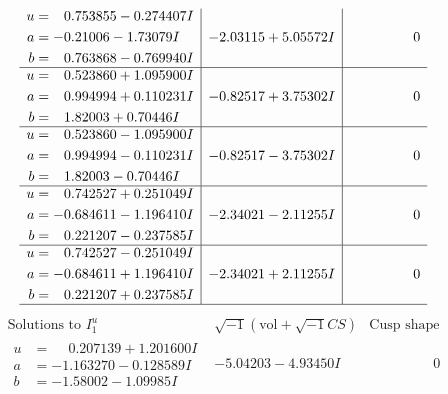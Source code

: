 \documentclass[1p]{elsarticle_modified}
\theoremstyle{definition}
\newcommand{\I}{\sqrt{-1}}
\begin{document}
$$\begin{array}{c|c|c}
\begin{aligned}
u &= \phantom{-}0.753855 - 0.274407 I \\
a &= -0.21006 - 1.73079 I \\
b &= \phantom{-}0.763868 - 0.769940 I\end{aligned}
 & -2.03115 + 5.05572 I & \phantom{-0.000000 } 0 \\ \hline\begin{aligned}
u &= \phantom{-}0.523860 + 1.095900 I \\
a &= \phantom{-}0.994994 + 0.110231 I \\
b &= \phantom{-}1.82003 + 0.70446 I\end{aligned}
 & -0.82517 + 3.75302 I & \phantom{-0.000000 } 0 \\ \hline\begin{aligned}
u &= \phantom{-}0.523860 - 1.095900 I \\
a &= \phantom{-}0.994994 - 0.110231 I \\
b &= \phantom{-}1.82003 - 0.70446 I\end{aligned}
 & -0.82517 - 3.75302 I & \phantom{-0.000000 } 0 \\ \hline\begin{aligned}
u &= \phantom{-}0.742527 + 0.251049 I \\
a &= -0.684611 - 1.196410 I \\
b &= \phantom{-}0.221207 - 0.237585 I\end{aligned}
 & -2.34021 - 2.11255 I & \phantom{-0.000000 } 0 \\ \hline\begin{aligned}
u &= \phantom{-}0.742527 - 0.251049 I \\
a &= -0.684611 + 1.196410 I \\
b &= \phantom{-}0.221207 + 0.237585 I\end{aligned}
 & -2.34021 + 2.11255 I & \phantom{-0.000000 } 0\\
 \hline 
 \end{array}$$\newpage$$\begin{array}{c|c|c}  
\text{Solutions to }I^u_{1}& \I (\text{vol} + \sqrt{-1}CS) & \text{Cusp shape}\\
 \hline 
\begin{aligned}
u &= \phantom{-}0.207139 + 1.201600 I \\
a &= -1.163270 - 0.128589 I \\
b &= -1.58002 - 1.09985 I\end{aligned}
 & -5.04203 - 4.93450 I & \phantom{-0.000000 } 0 \\ \hline\begin{aligned}

\end{aligned}
\end{array}$$
\end{document}
